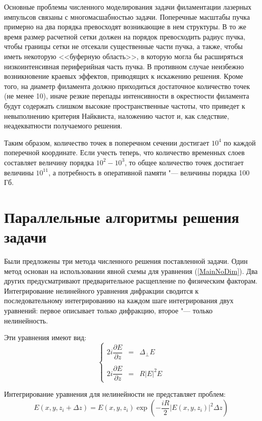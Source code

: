 Основные проблемы численного моделирования задачи филаментации лазерных импульсов связаны с многомасшабностью задачи.
Поперечные масштабы пучка примерно на два порядка превосходят возникающие в нем структуры.
В то же время размер расчетной сетки должен на порядок превосходить радиус пучка, чтобы границы сетки не отсекали существенные части пучка, а также, чтобы иметь некоторую <<буферную область>>, в которую могла бы расширяться низкоинтенсивная периферийная часть пучка.
В противном случае неизбежно возникновение краевых эффектов, приводящих к искажению решения.
Кроме того, на диаметр филамента должно приходиться достаточное количество точек (не менее 10), иначе резкие перепады интенсивности в окрестности филамента будут содержать слишком высокие пространственные частоты, что приведет к невыполнению критерия Найквиста, наложению частот и, как следствие, неадекватности получаемого решения.

Таким образом, количество точек в поперечном сечении достигает $10^4$ по каждой поперечной координате. Если учесть теперь, что количество временных слоев составляет величину порядка $10^2-10^3$, то общее количество точек достигает величины $10^{11}$, а потребность в оперативной памяти "--- величины порядка 100 Гб.

\section{Параллельные алгоритмы решения задачи}\label{SplitMethod}

Были предложены три метода численного решения поставленной задачи.
Один метод основан на использовании явной схемы для уравнения (\ref{MainNoDim}).
Два других предусматривают предварительное расщепление по физическим факторам.
Интегрирование нелинейного уравнения дифракции сводится к последовательному интегрированию на каждом шаге интегрирования двух уравнений: первое описывает только дифракцию, второе "--- только нелинейность.

Эти уравнения имеют вид:
\begin{equation}\label{Split}
    \left\{
	\begin{array}{rcl}
		2i\dfrac{\partial E}{\partial z}&=&\Delta_{\perp}E \\
        \\
        2i\dfrac{\partial E}{\partial z}&=&R\left|E\right|^2E
	\end{array}
	\right.
\end{equation}

Интегрирование уравнения для нелинейности не представляет проблем:
\begin{equation}\label{KerrSolution}
    E(x,y,z_i + \Delta z) = E(x,y,z_i)\exp\left(-\frac{iR}{2}\left|E(x,y,z_i)\right|^2\Delta z\right)
\end{equation}

